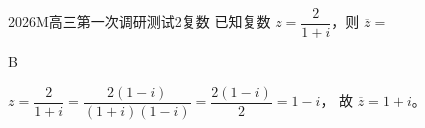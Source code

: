 
\begin{problem}{2026}{M}{高三第一次调研测试}{2}{复数}
已知复数 $z=\dfrac{2}{1+i}$，则 $\overline{z}=$
\begin{choices}
\end{choices}
\end{problem}

\begin{answer}
B
\end{answer}

\begin{solutions}
$z=\dfrac{2}{1+i}=\dfrac{2(1-i)}{(1+i)(1-i)}=\dfrac{2(1-i)}{2}=1-i$，  
故 $\overline{z}=1+i$。
\end{solutions}